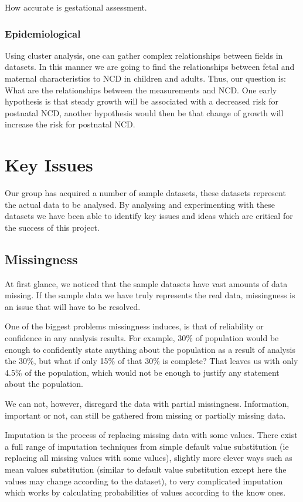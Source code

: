 \documentclass[bsc]{abdnthesis}
\begin{document}
How accurate is gestational assessment. 
\subsection{Epidemiological} %
\label{sub:epidemiological}
Using cluster analysis, one can gather complex relationships between fields in datasets. In this manner we are going to find the relationships between fetal and maternal characteristics to NCD in children and adults. Thus, our question is: What are the relationships between the measurements and NCD. One early hypothesis is that steady growth will be associated with a decreased risk for postnatal NCD, another hypothesis would then be that change of growth will increase the risk for postnatal NCD. 


\chapter{Key Issues}
Our group has acquired a number of sample datasets, these datasets represent the actual data to be analysed. By analysing and experimenting with these datasets we have been able to identify key issues and ideas which are critical for the success of this project.
\section{Missingness} %
\label{sec:missingness}
At first glance, we noticed that the sample datasets have vast amounts of data missing. If the sample data we have truly represents the real data, missingness is an issue that will have to be resolved. 

One of the biggest problems missingness induces, is that of reliability or confidence in any analysis results. For example, 30\% of population would be enough to confidently state anything about the population as a result of analysis the 30\%, but what if only 15\% of that 30\% is complete? That leaves us with only 4.5\% of the population, which would not be enough to justify any statement about the population. 

We can not, however, disregard the data with partial missingness. Information, important or not, can still be gathered from missing or partially missing data. 

Imputation is the process of replacing missing data with some values\cite{ imp}. There exist a full range of imputation techniques from simple default value substitution (ie replacing all missing values with some values)\cite{ imp-default}, slightly more clever ways such as mean values substitution \cite{ imp-mean}(similar to default value substitution except here the values may change according to the dataset), to very complicated imputation which works by calculating probabilities of values according to the know ones\cite{ imp-mice, imp-mi}. 
\end{document}
